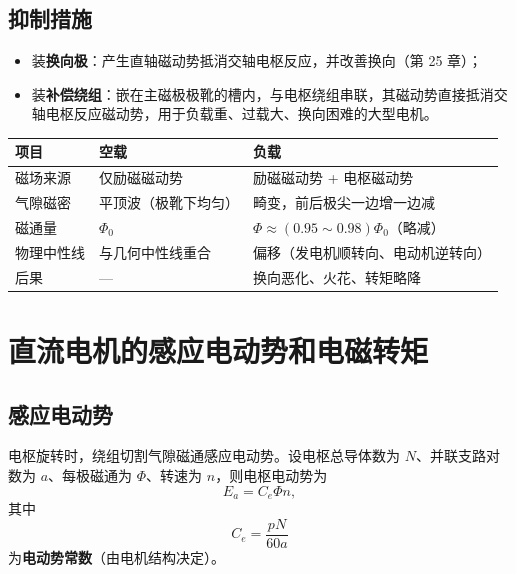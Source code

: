 \subsection{抑制措施}
\begin{itemize}
  \item 装\textbf{换向极}：产生直轴磁动势抵消交轴电枢反应，并改善换向（第 25 章）；
  \item 装\textbf{补偿绕组}：嵌在主磁极极靴的槽内，与电枢绕组串联，其磁动势直接抵消交轴电枢反应磁动势，用于负载重、过载大、换向困难的大型电机。
\end{itemize}

\begin{center}
\begin{tabular}{@{}p{2.2cm}p{4.2cm}p{5.0cm}@{}}
\toprule
项目 & 空载 & 负载 \\
\midrule
磁场来源 & 仅励磁磁动势 & 励磁磁动势 + 电枢磁动势 \\
气隙磁密 & 平顶波（极靴下均匀） & 畸变，前后极尖一边增一边减 \\
磁通量 & $\Phi_0$ & $\Phi\approx(0.95\sim0.98)\Phi_0$（略减） \\
物理中性线 & 与几何中性线重合 & 偏移（发电机顺转向、电动机逆转向） \\
后果 & — & 换向恶化、火花、转矩略降 \\
\bottomrule
\end{tabular}
\end{center}


\section{直流电机的感应电动势和电磁转矩}

\subsection{感应电动势}
电枢旋转时，绕组切割气隙磁通感应电动势。设电枢总导体数为 $N$、并联支路对数为 $a$、每极磁通为 $\Phi$、转速为 $n$，则电枢电动势为
\begin{equation}
E_a=C_e\Phi n,
\end{equation}
其中
\begin{equation}
C_e=\frac{pN}{60a}
\end{equation}
为\textbf{电动势常数}（由电机结构决定）。

